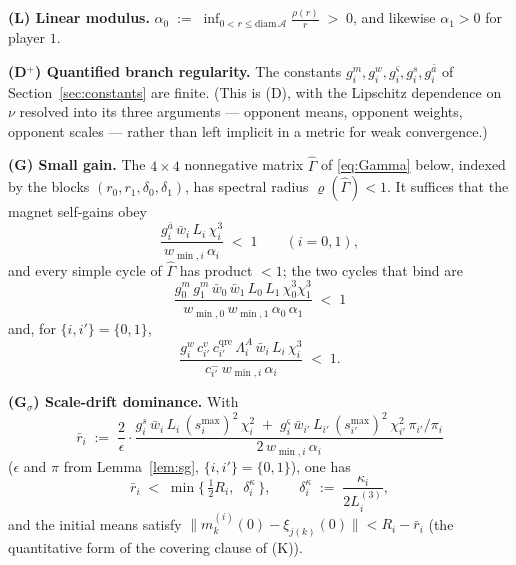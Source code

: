 \documentclass[11pt]{article}
\theoremstyle{definition}
\newcommand{\cA}{\mathcal{A}}
\begin{document}
\begin{conditions}
\item[\textbf{(L) Linear modulus.}] $\displaystyle
  \alpha_0 \;:=\; \inf_{0 < r \le \mathrm{diam}\,\cA} \frac{\rho(r)}{r} \;>\; 0$,
  and likewise $\alpha_1 > 0$ for player $1$.

\item[\textbf{(D$^+$) Quantified branch regularity.}] The constants
  $g^m_i, g^w_i, g^\varsigma_i, g^s_i, g^{\bar a}_i$ of
  Section~\ref{sec:constants} are finite. (This is (D), with the Lipschitz
  dependence on $\nu$ resolved into its three arguments --- opponent means,
  opponent weights, opponent scales --- rather than left implicit in a metric for
  weak convergence.)

\item[\textbf{(G) Small gain.}] The $4 \times 4$ nonnegative matrix
  $\hat\Gamma$ of \eqref{eq:Gamma} below, indexed by the blocks
  $(r_0, r_1, \delta_0, \delta_1)$, has spectral radius
  $\varrho(\hat\Gamma) < 1$. It suffices that the magnet self-gains obey
  \begin{equation}\label{eq:selfgain}
    \frac{g^{\bar a}_i\, \bar w_i\, L_i\, \chi_i^3}{w_{\min,i}\, \alpha_i}
    \;<\; 1 \qquad (i = 0,1),
  \end{equation}
  and every simple cycle of $\hat\Gamma$ has product $< 1$; the two cycles that
  bind are
  \begin{equation}\label{eq:cyclemean}
    \frac{g^m_0\,g^m_1\,\bar w_0\,\bar w_1\,L_0\,L_1\,\chi_0^3\chi_1^3}
         {w_{\min,0}\,w_{\min,1}\,\alpha_0\,\alpha_1} \;<\; 1
    \tag{mean\,$\leftrightarrow$\,mean}
  \end{equation}
  and, for $\{i,i'\} = \{0,1\}$,
  \begin{equation}\label{eq:cycleweight}
    \frac{g^w_i\, c^v_{i'}\, c^{\mathrm{qre}}_{i'}\, \Lambda^A_i\,
          \bar w_i\, L_i\, \chi_i^3}
         {c^-_{i'}\, w_{\min,i}\, \alpha_i} \;<\; 1 .
    \tag{mean\,$\leftrightarrow$\,weight}
  \end{equation}

\item[\textbf{(G$_\sigma$) Scale-drift dominance.}] With
  \begin{equation}\label{eq:barr}
    \bar r_i \;:=\; \frac{2}{\epsilon}\cdot
    \frac{g^s_i\, \bar w_i\, L_i\, (s^{\max}_i)^2\, \chi_i^2
        \;+\; g^\varsigma_i\, \bar w_{i'}\, L_{i'}\, (s^{\max}_{i'})^2\,
              \chi_{i'}^2 \,\pi_{i'}/\pi_i}
         {2\, w_{\min,i}\, \alpha_i}
  \end{equation}
  ($\epsilon$ and $\pi$ from Lemma~\ref{lem:sg}, $\{i,i'\} = \{0,1\}$), one has
  \begin{equation}
    \bar r_i \;<\; \min\Big\{\, \tfrac{1}{2}R_i,\;\; \delta^\kappa_i \,\Big\},
    \qquad
    \delta^\kappa_i \;:=\; \frac{\kappa_i}{2 L^{(3)}_i},
  \end{equation}
  and the initial means satisfy $\|m^{(i)}_k(0) - \xi_{j(k)}(0)\| < R_i - \bar r_i$
  (the quantitative form of the covering clause of (K)).


\end{conditions}
\end{document}
